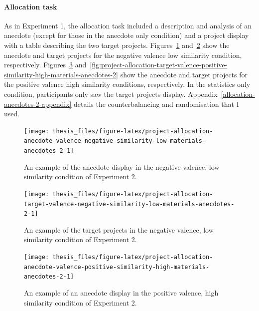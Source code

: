 \documentclass[a4paper, nobind, dvipsnames]{templates/ociamthesis}
\theoremstyle{definition}
\theoremstyle{definition}
\theoremstyle{definition}
\theoremstyle{definition}
\theoremstyle{remark}
\begin{document}
\hypertarget{allocation-anecdotes-2}{%
\paragraph{Allocation task}\label{allocation-anecdotes-2}}

As in Experiment 1, the allocation task included a description and analysis of
an anecdote (except for those in the anecdote only condition) and a project
display with a table describing the two target projects.
Figures~\ref{fig:project-allocation-anecdote-valence-negative-similarity-low-materials-anecdotes-2}
and~\ref{fig:project-allocation-target-valence-negative-similarity-low-materials-anecdotes-2}
show the anecdote and target projects for the negative valence low similarity
condition, respectively.
Figures~\ref{fig:project-allocation-anecdote-valence-positive-similarity-high-materials-anecdotes-2}
and~\ref{fig:project-allocation-target-valence-positive-similarity-high-materials-anecdotes-2}
show the anecdote and target projects for the positive valence high similarity
conditions, respectively. In the statistics only condition, participants only
saw the target projects display. Appendix~\ref{allocation-anecdotes-2-appendix}
details the counterbalancing and randomisation that I used.



\begin{figure}
\texttt{[image: thesis\_files/figure-latex/project-allocation-anecdote-valence-negative-similarity-low-materials-anecdotes-2-1]} \caption{An example of the anecdote display in the negative valence, low similarity condition of Experiment 2.}\label{fig:project-allocation-anecdote-valence-negative-similarity-low-materials-anecdotes-2}
\end{figure}



\begin{figure}
\texttt{[image: thesis\_files/figure-latex/project-allocation-target-valence-negative-similarity-low-materials-anecdotes-2-1]} \caption{An example of the target projects in the negative valence, low similarity condition of Experiment 2.}\label{fig:project-allocation-target-valence-negative-similarity-low-materials-anecdotes-2}
\end{figure}



\begin{figure}
\texttt{[image: thesis\_files/figure-latex/project-allocation-anecdote-valence-positive-similarity-high-materials-anecdotes-2-1]} \caption{An example of an anecdote display in the positive valence, high similarity condition of Experiment 2.}\label{fig:project-allocation-anecdote-valence-positive-similarity-high-materials-anecdotes-2}
\end{figure}
\end{document}
